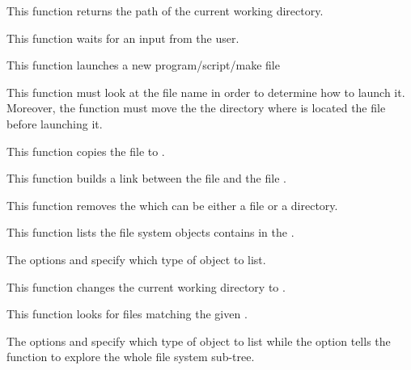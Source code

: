          {
	   This function returns the path of the current working directory.
	 }

         {
	   This function waits for an input from the user.
	 }

         {
	   This function launches a new program/script/make file \etc{}

	   \-

	   This function must look at the file name in order to determine
	   how to launch it. Moreover, the function must move the the
	   directory where is located the file before launching it.
	 }

         {
	   This function copies the file  to
	   .
	 }

         {
	   This function builds a link between the file 
	   and the file .
	 }

         {
	   This function removes the  which can be either
	   a file or a directory.
	 }

         {
	   This function lists the file system objects contains in the
	   .

	   \-

	   The options  and 
	   specify which type of object to list.
	 }

         {
	   This function changes the current working directory to
	   .
	 }

         {
	   This function looks for files matching the given .

	   \-

	   The options  and 
	   specify which type of object to list while the
	    option tells the function to explore
	   the whole file system sub-tree.
	 }

